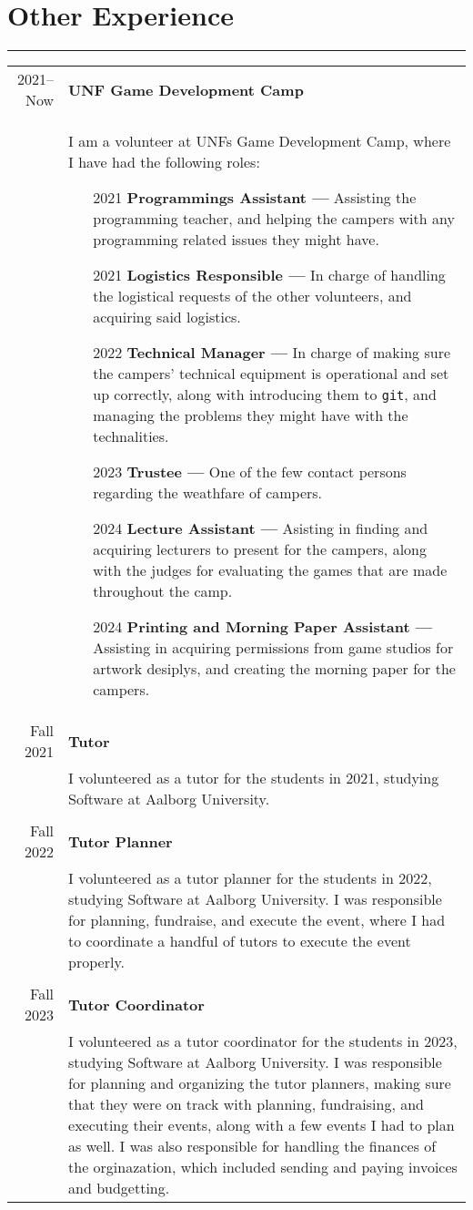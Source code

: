 \documentclass{article}
\begin{document}
\section*{Other Experience}
\hrule width5cm
\begin{longtabu} to \textwidth {r|X}
2021--Now & \textbf{UNF Game Development Camp}\\
&   I am a volunteer at UNFs Game Development Camp, where I have had the following roles:
    \begin{itemize}\setlength\itemsep{0em}
        \item[2021] \textbf{Programmings Assistant ---} Assisting the programming teacher, and
            helping the campers with any programming related issues they might have.
        \item[2021] \textbf{Logistics Responsible ---} In charge of handling the logistical
            requests of the other volunteers, and acquiring said logistics.
        \item[2022] \textbf{Technical Manager ---} In charge of making sure the campers'
            technical equipment is operational and set up correctly,
            along with introducing them to \texttt{git}, and managing
            the problems they might have with the technalities.
        \item[2023] \textbf{Trustee ---} One of the few contact persons regarding the weathfare of campers.
        \item[2024] \textbf{Lecture Assistant ---} Asisting in finding and acquiring lecturers to present for the campers, along with the judges for evaluating the games that are made throughout the camp.
        \item[2024] \textbf{Printing and Morning Paper Assistant ---} Assisting in acquiring permissions from game studios for artwork desiplys, and creating the morning paper for the campers.
    \end{itemize}
    \\
Fall 2021 & \textbf{Tutor}\\
&           I volunteered as a tutor for the students in 2021, studying Software at Aalborg University.\\\\
Fall 2022 & \textbf{Tutor Planner}\\
&           I volunteered as a tutor planner for the students in 2022, studying Software at Aalborg University.
            I was responsible for planning, fundraise, and execute the event, where I had to coordinate a handful of tutors to execute the event properly.\\\\
Fall 2023 & \textbf{Tutor Coordinator}\\
&           I volunteered as a tutor coordinator for the students in 2023, studying Software at Aalborg University.
            I was responsible for planning and organizing the tutor planners, making sure that they were on track with planning, fundraising, and executing their events, along with a few events I had to plan as well.
            I was also responsible for handling the finances of the orginazation, which included sending and paying invoices and budgetting.
\end{longtabu}
\iffalse
\section*{References}
\hrule width5cm \ \\
Provided upon request.
\fi
\end{document}
